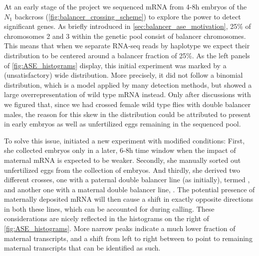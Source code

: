 
At an early stage of the project we sequenced mRNA from 4-8h embryos of the
$N_1$ backcross (\cref{fig:balancer_crossing_scheme}) to explore the power to
detect significant \ase genes. As briefly introduced in
\cref{sec:balancer_ase_motivation}, 25\% of chromosomes 2 and 3 within the
genetic pool consist of balancer chromosomes. This means that when we separate
RNA-seq reads by haplotype we expect their distribution to be centered around a
balancer fraction of 25\%. As the left panels of \cref{fig:ASE_histograms}
display, this initial experiment was marked by a (unsatisfactory) wide
distribution. More precisely, it did not follow a binomial distribution, which
is a model applied by many \ase detection methods, but showed a large
overrepresentation of wild type mRNA instead. Only after discussions with
\garfield we figured that, since we had crossed female wild type flies with double
balancer males, the reason for this skew in the distribution could be attributed
to 
present in early embryos as well as unfertilized eggs remaining in the sequenced
pool.

To solve this issue, \yad initiated a new experiment with modified conditions: First, she
collected embryos only in a later, 6-8h time window when the impact of maternal
mRNA is expected to be weaker. Secondly, she manually sorted out unfertilized eggs
from the collection of embryos. And thirdly, she derived two different crosses,
one with a paternal double balancer line (as initially), termed \Npat,
and another one with a maternal double balancer line, \Nmat. The potential
presence of maternally deposited mRNA will then cause a shift in exactly opposite
directions in both these lines, which can be accounted for during \ase
calling. These considerations are nicely reflected in the histograms on the
right of \cref{fig:ASE_histograms}. More narrow peaks indicate a much lower
fraction of maternal transcripts, and a shift from left to right between \Npat
to \Nmat point to remaining maternal transcripts that can be identified as such.






